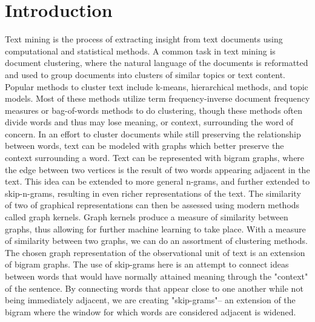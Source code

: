 %
%
%

\chapter{Introduction}
\label{introduction}

Text mining is the process of extracting insight from text documents using computational and statistical methods. A common task in text mining is document clustering, where the natural language of the documents is reformatted and used to group documents into clusters of similar topics or text content. Popular methods to cluster text include k-means, hierarchical methods, and topic models. Most of these methods utilize term frequency-inverse document frequency measures  or bag-of-words methods to do clustering, though these methods often divide words and thus may lose meaning, or context, surrounding the word of concern. In an effort to cluster documents while still preserving the relationship between words, text can be modeled with graphs which better preserve the context surrounding a word. Text can be represented with bigram graphs, where the edge between two vertices is the result of two words appearing adjacent in the text. This idea can be extended to more general n-grams, and further extended to skip-n-grams, resulting in even richer representations of the text. The similarity of two of graphical representations can then be assessed using modern methods called graph kernels. Graph kernels produce a measure of similarity between graphs, thus allowing for further machine learning to take place. With a measure of similarity between two graphs, we can do an assortment of clustering methods. \\

The chosen graph representation of the observational unit of text is an extension of bigram graphs. The use of skip-grams here is an attempt to connect ideas between words that would have normally attained meaning through the "context" of the sentence. By connecting words that appear close to one another while not being immediately adjacent, we are creating "skip-grams"-- an extension of the bigram where the window for which words are considered adjacent is widened. \\


